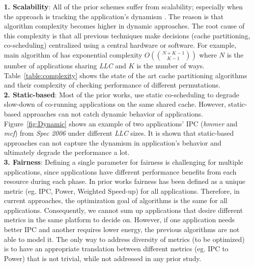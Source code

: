 \indent \textbf{1. Scalability}: All of the prior schemes suffer from scalability; especially when the approach is tracking the application's dynamism \cite{qureshi2006utility, zhuravlev2010addressing, jiang2008analysis}. The reason is that algorithm complexity becomes higher in dynamic approaches. The root cause of this complexity is that all previous techniques make decisions (cache partitioning, co-scheduling) centralized using a central hardware or software. For example, main algorithm of \cite{qureshi2006utility} has exponential complexity $O( \binom{N+K-1}{K-1} )$ where $N$ is the number of applications sharing \textit{LLC} and $K$ is the number of ways. Table~\ref{table:complexity} shows the state of the art cache partitioning algorithms and their complexity of checking performance of different permutations.\\
\indent \textbf{2. Static-based}: Most of the prior works, use static co-scheduling to degrade slow-down of co-running applications on the same shared cache. However, static-based approaches can not catch dynamic behavior of applications. Figure~\ref{fig:Dynamic} shows an example of two applications' IPC (\textit{hmmer} and \textit{mcf}) from \textit{Spec 2006} under different \textit{LLC} sizes. It is shown that static-based approaches can not capture the dynamism in application's behavior and ultimately degrade the performance a lot. \\
\indent \textbf{3. Fairness}: Defining a single parameter for fairness is challenging for multiple applications, since applications have different performance benefits from each resource during each phase. In prior works fairness has been defined as a unique metric (eg. IPC, Power, Weighted Speed-up) for all applications. Therefore, in current approaches, the optimization goal of algorithms is the same for all applications. Consequently, we cannot sum up applications that desire different metrics in the same platform to decide on. However, if one application needs better IPC and another requires lower energy, the previous algorithms are not able to model it. The only way to address diversity of metrics (to be optimized) is to have an appropriate translation between different metrics (eg. IPC to Power) that is not trivial, while not addressed in any prior study.\\
